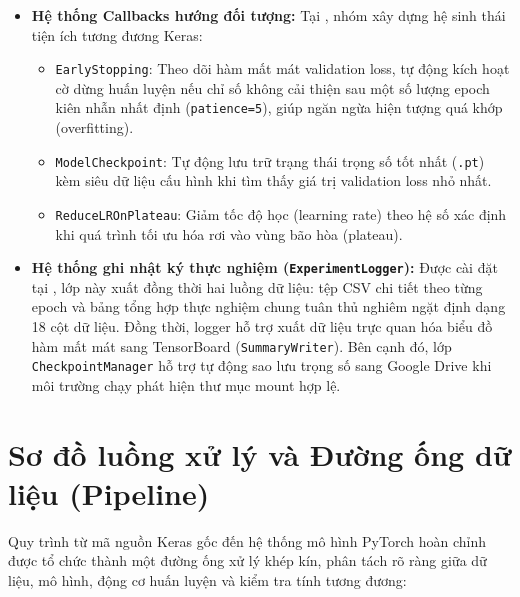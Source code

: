 \begin{itemize}
\item \textbf{Hệ thống Callbacks hướng đối tượng:} Tại , nhóm xây dựng hệ sinh thái tiện ích tương đương Keras:
\begin{itemize}
\item \texttt{EarlyStopping}: Theo dõi hàm mất mát validation loss, tự động kích hoạt cờ dừng huấn luyện nếu chỉ số không cải thiện sau một số lượng epoch kiên nhẫn nhất định (\texttt{patience=5}), giúp ngăn ngừa hiện tượng quá khớp (overfitting).
\item \texttt{ModelCheckpoint}: Tự động lưu trữ trạng thái trọng số tốt nhất (\texttt{.pt}) kèm siêu dữ liệu cấu hình khi tìm thấy giá trị validation loss nhỏ nhất.
\item \texttt{ReduceLROnPlateau}: Giảm tốc độ học (learning rate) theo hệ số xác định khi quá trình tối ưu hóa rơi vào vùng bão hòa (plateau).
\end{itemize}

\item \textbf{Hệ thống ghi nhật ký thực nghiệm (\texttt{ExperimentLogger}):} Được cài đặt tại , lớp này xuất đồng thời hai luồng dữ liệu: tệp CSV chi tiết theo từng epoch và bảng tổng hợp thực nghiệm chung  tuân thủ nghiêm ngặt định dạng 18 cột dữ liệu. Đồng thời, logger hỗ trợ xuất dữ liệu trực quan hóa biểu đồ hàm mất mát sang TensorBoard (\texttt{SummaryWriter}). Bên cạnh đó, lớp \texttt{CheckpointManager} hỗ trợ tự động sao lưu trọng số sang Google Drive khi môi trường chạy phát hiện thư mục mount hợp lệ.
\end{itemize}

\section{Sơ đồ luồng xử lý và Đường ống dữ liệu (Pipeline)}
Quy trình từ mã nguồn Keras gốc đến hệ thống mô hình PyTorch hoàn chỉnh được tổ chức thành một đường ống xử lý khép kín, phân tách rõ ràng giữa dữ liệu, mô hình, động cơ huấn luyện và kiểm tra tính tương đương:

